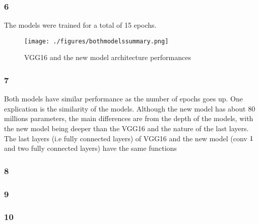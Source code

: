 \documentclass[12pt]{article}
\theoremstyle{definition}
\begin{document}
\subsubsection*{6}
The models were trained for a total of 15 epochs.
\begin{figure}
  \centering
  \texttt{[image: ./figures/bothmodelssummary.png]}
  \caption{VGG16 and the new model architecture performances}
\end{figure}
\subsubsection*{7}
Both models have similar performance as the number of epochs goes up. One
explication is the similarity of the models. Although the new model has about 80
millions parameters, the main differences are from the depth of the models, with
the new model being deeper than the VGG16 and the nature of the last layers.
The last layers (i.e fully connected layers) of VGG16 and the new model (conv
$1\time 1$ and two fully connected layers) have the same functions
\subsubsection*{8}
\subsubsection*{9}
\subsubsection*{10}
\end{document}
